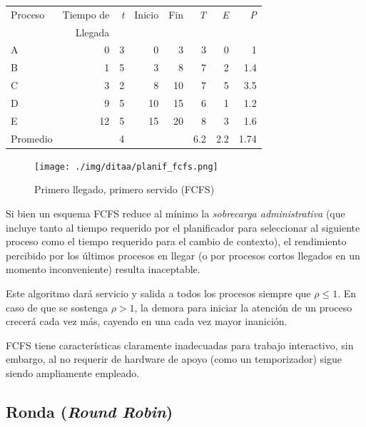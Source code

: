 \documentclass[11pt,fleqn]{book} %
\begin{document}
\begin{center}
\begin{tabular}{lrrrrrrr}
 Proceso   &  Tiempo de  &  \emph{t}  &  Inicio  &  Fin  &  \emph{T}  &  \emph{E}  &  \emph{P}  \\
           &    Llegada  &            &          &       &            &            &            \\
\hline
 A         &          0  &         3  &       0  &    3  &         3  &         0  &         1  \\
 B         &          1  &         5  &       3  &    8  &         7  &         2  &       1.4  \\
 C         &          3  &         2  &       8  &   10  &         7  &         5  &       3.5  \\
 D         &          9  &         5  &      10  &   15  &         6  &         1  &       1.2  \\
 E         &         12  &         5  &      15  &   20  &         8  &         3  &       1.6  \\
\hline
 Promedio  &             &         4  &          &       &       6.2  &       2.2  &      1.74  \\
\end{tabular}
\end{center}



\begin{figure}[htb]
\centering
\texttt{[image: ./img/ditaa/planif\_fcfs.png]}
\caption{\label{PLAN_planif_fcfs}Primero llegado, primero servido (FCFS)}
\end{figure}

Si bien un esquema FCFS reduce al mínimo la \emph{sobrecarga administrativa} (que incluye tanto al tiempo requerido por el
planificador para seleccionar al siguiente proceso como el tiempo
requerido para el cambio de contexto), el rendimiento percibido por
los últimos procesos en llegar (o por procesos cortos llegados en un
momento inconveniente) resulta inaceptable.

Este algoritmo dará servicio y salida a todos los procesos siempre que
$\rho \le 1$. En caso de que se sostenga $\rho > 1$, la demora para
iniciar la atención de un proceso crecerá cada vez más, cayendo en
una cada vez mayor inanición.

FCFS tiene características claramente inadecuadas para trabajo
interactivo, sin embargo, al no requerir de hardware de apoyo (como
un temporizador) sigue siendo ampliamente empleado.
\subsection{Ronda (\emph{Round Robin})}
\label{sec-4-2-3}
\label{PLAN_RoundRobin}
\end{document}
